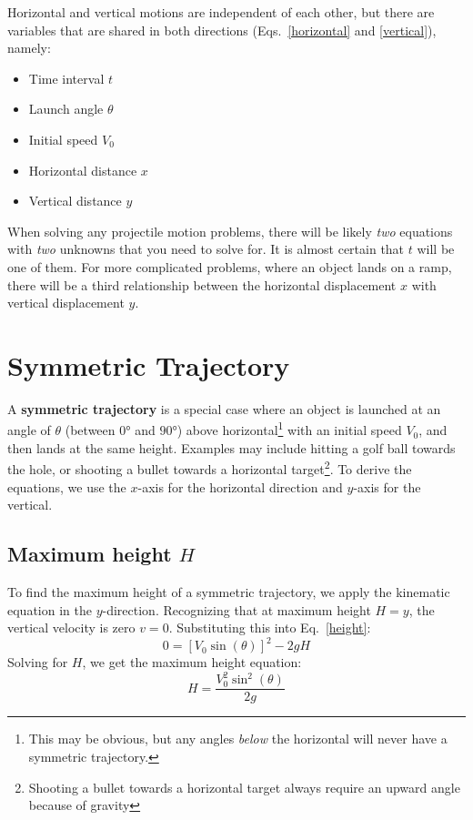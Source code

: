 \documentclass[11pt,titlepage,twoside]{article}
\begin{document}
Horizontal and vertical motions are independent of each other, but there are
variables that are shared in both directions (Eqs.~\ref{horizontal} and
\ref{vertical}), namely:
\begin{itemize}[nosep]
\item Time interval $t$
\item Launch angle $\theta$
\item Initial speed $V_0$
\item Horizontal distance $x$
\item Vertical distance $y$
\end{itemize}
When solving any projectile motion problems, there will be likely \emph{two}
equations with \emph{two} unknowns that you need to solve for. It is almost
certain that $t$ will be one of them. For more complicated problems,
where an object lands on a ramp, there will be a third relationship between
the horizontal displacement $x$ with vertical displacement $y$.



\section{Symmetric Trajectory}

A \textbf{symmetric trajectory} is a special case where an object is launched
at an angle of $\theta$ (between $\ang{0}$ and $\ang{90}$) above
horizontal\footnote{This may be obvious, but any angles \emph{below} the 
horizontal will never have a symmetric trajectory.} with an initial speed
$V_0$, and then lands at the same height. Examples may include hitting a golf
ball towards the hole, or shooting a bullet towards a horizontal
target\footnote{Shooting a bullet towards a horizontal target always require an
upward angle because of gravity}. To derive the equations, we use the $x$-axis
for the horizontal direction and $y$-axis for the vertical.

\subsection{Maximum height $H$}
To find the maximum height of a symmetric trajectory, we apply the kinematic
equation in the $y$-direction. Recognizing that at maximum height $H=y$, the
vertical velocity is zero $v=0$. Substituting this into Eq.~\ref{height}:
\begin{equation}
  0 = [V_0\sin(\theta)]^2-2gH
\end{equation}
Solving for $H$, we get the maximum height equation:
\begin{equation}
  \boxed{H=\frac{V_0^2\sin^2(\theta)}{2g}}
\end{equation}
\end{document}
